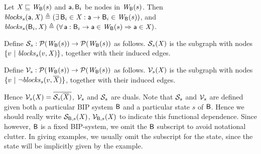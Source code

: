 \begin{definition} \label{defn:blocks} 
Let $\mathit{X} \sqsubseteq \mathit{W}_{\mathsf{B}}({s})$ and $\mathsf{a}, \mathsf{B}_i$ be nodes in $\mathit{W}_{\mathsf{B}}({s})$. Then 
$\mathit{blocks}_{s}(\mathsf{a}, \mathit{X}) \triangleq (\exists\, \mathsf{B}_i \in \mathit{X} : \mathsf{a} \rightarrow \mathsf{B}_i \in \mathit{W}_{\mathsf{B}}({s}))$, and 
$\mathit{blocks}_{s}(\mathsf{B}_i, \mathit{X}) \triangleq (\forall\, \mathsf{a} : \mathsf{B}_i \rightarrow \mathsf{a} \in \mathit{W}_{\mathsf{B}}({s}) \Rightarrow \mathsf{a} \in \mathit{X})$.
\end{definition}

\begin{definition}[$\SFsymb_s$]  \label{defn:scFix} 
Define $\mathcal{S}_s: \mathcal{P}(\mathit{W}_{\mathsf{B}}({s})) \to \mathcal{P}(\mathit{W}_{\mathsf{B}}({s}))$ as follows.
$\mathcal{S}_{s}(\mathit{X})$ is the subgraph with nodes $\{ v ~|~ \mathit{blocks}_{s}(v, \mathit{X})  \}$, together with their induced edges.
\end{definition}

\begin{definition}[$\VFsymb_s$]  \label{defn:violFix}
Define $\mathcal{V}_s: \mathcal{P}(\mathit{W}_{\mathsf{B}}({s})) \to \mathcal{P}(\mathit{W}_{\mathsf{B}}({s}))$ as follows.
$\mathcal{V}_{s}(\mathit{X})$ is the subgraph with nodes
$\{ v ~|~ \neg \mathit{blocks}_{s}(v, \overline{\mathit{\mathit{X}}}) \}$, together with their induced edges.
\end{definition}
%
Hence $\mathcal{V}_{s}(\mathit{X}) = \overline{\mathit{\mathcal{S}_{s}(\overline{\mathit{\mathit{X}}})}}$, \ie $\VFsymb_s$ and $\SFsymb_s$ are duals.
Note that $\SFsymb_s$ and $\VFsymb_s$ are defined given both a particular BIP system 
$\mathsf{B}$ and a particular state $s$ of $\mathsf{B}$. Hence we should really write 
$\mathcal{S}_{\mathsf{B},s}(\mathit{X})$, $\mathcal{V}_{\mathsf{B},s}(\mathit{X})$ to indicate this functional dependence. 
Since however, 
$\mathsf{B}$ is a fixed BIP-system, we omit the $\mathsf{B}$ subscript to avoid notational clutter.
In giving examples, we usually omit the subscript for the state, since the state will be implicitly given by the example.


